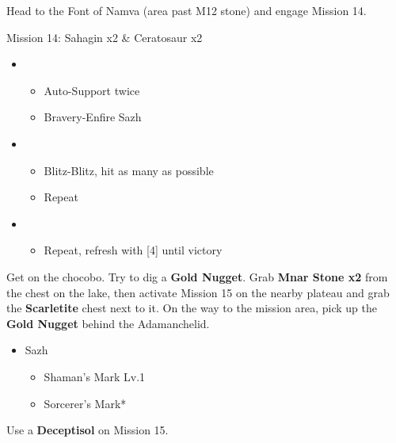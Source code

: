 Head to the Font of Namva (area past M12 stone) and engage Mission 14.

\begin{battle}{Mission 14: Sahagin x2 \& Ceratosaur x2}
	\begin{itemize}
		\item \third
			\begin{itemize}
				\item Auto-Support twice
				\item Bravery-Enfire Sazh
			\end{itemize}
		\item \fourth
			\begin{itemize}
				\item Blitz-Blitz, hit as many as possible
				\item Repeat
			\end{itemize}
		\item \sixth
			\begin{itemize}
				\item Repeat, refresh with [4] until victory
			\end{itemize}
	\end{itemize}
\end{battle}

Get on the chocobo.
Try to dig a \textbf{Gold Nugget}.
Grab \textbf{Mnar Stone x2} from the chest on the lake, then activate Mission 15 on the nearby plateau and grab the \textbf{Scarletite} chest next to it.
On the way to the mission area, pick up the \textbf{Gold Nugget} behind the Adamanchelid.

\begin{menu}
	\begin{itemize}
		\equip
		\begin{itemize}
			\item Sazh
				\begin{itemize}
					\item Shaman's Mark Lv.1
					\item Sorcerer's Mark*
				\end{itemize}
		\end{itemize}
	\end{itemize}
\end{menu}

Use a \textbf{Deceptisol} on Mission 15.

